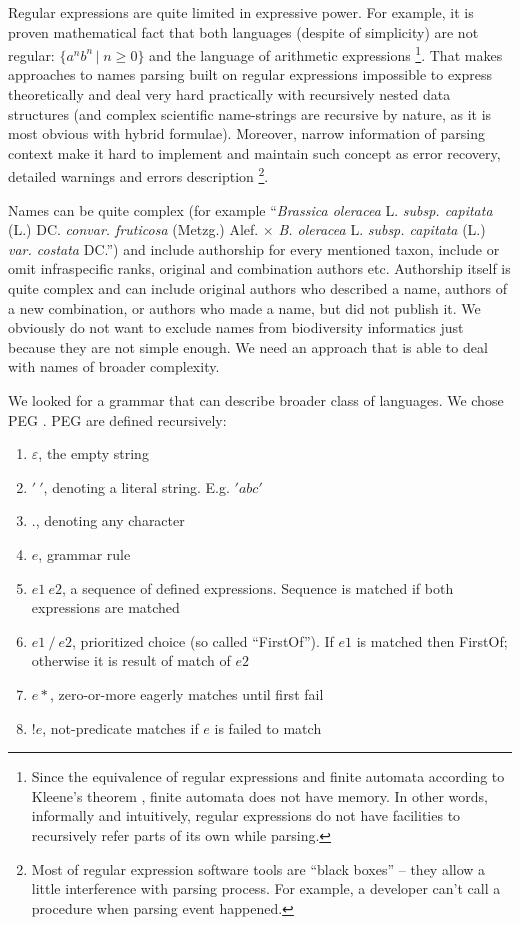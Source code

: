 \documentclass{bmcart}
\begin{document}
Regular expressions are quite limited in expressive power. For example, it is
proven mathematical fact that both languages (despite of simplicity) are not
regular: $\{a^nb^n\,\vert\; n\ge 0\} $ and the language of arithmetic
expressions \footnote{Since the equivalence of regular expressions and finite
automata according to Kleene's theorem \cite{yu1997handbook}, finite automata
does not have memory. In other words, informally and intuitively, regular
expressions do not have facilities to recursively refer parts of its own while
parsing.}. That makes approaches to names parsing built on regular expressions
\cite{gbif} impossible to express theoretically and deal very hard practically
with recursively nested data structures (and complex scientific name-strings
are recursive by nature, as it is most obvious with hybrid formulae).
Moreover, narrow information of parsing context make it hard to implement and
maintain such concept as error recovery, detailed warnings and errors
description \footnote{Most of regular expression software tools are ``black
boxes'' -- they allow a little interference with parsing process. For example, a
developer can't call a procedure when parsing event happened.}.

Names can be quite complex (for example ``\textit{Brassica oleracea} L.
\textit{subsp.  capitata} (L.) DC. \textit{convar. fruticosa} (Metzg.) Alef.
$\times$ \textit{B. oleracea} L. \textit{subsp. capitata} (L.) \textit{var.
costata} DC.'')  and include authorship for every mentioned taxon, include or
omit infraspecific ranks, original and combination authors etc. Authorship
itself is quite complex and can include original authors who described a name,
authors of a new combination, or authors who made a name, but did not publish
it. We obviously do not want to exclude names from biodiversity informatics
just because they are not simple enough. We need an approach that is able to
deal with names of broader complexity.

We looked for a grammar that can describe broader class of languages. We chose
PEG \cite{Ford2004}. PEG are defined recursively:

\begin{enumerate}
    \item $\varepsilon$, the empty string
    \item $'\ '$, denoting a literal string. E.g. $'abc'$
    \item $.$, denoting any character
    \item $e$, grammar rule
    \item $e1\ e2$, a sequence of defined expressions. Sequence is matched if
    both expressions are matched
    \item $e1\ /\ e2$, prioritized choice (so called ``FirstOf''). If $e1$ is
    matched then FirstOf; otherwise it is result of match of $e2$
    \item $e*$, zero-or-more eagerly matches until first fail
    \item $!e$, not-predicate matches if $e$ is failed to match
\end{enumerate}
\end{document}
